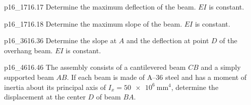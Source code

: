 \documentclass[a4paper]{article}
\newcounter{problem}
\numberwithin{equation}{problem}
\begin{document}


\begin{problemwithimage}{p16_17}{16.17}
  Determine the maximum deflection of the beam.
  $EI$ is constant.
\end{problemwithimage}

\begin{problemwithimage}{p16_17}{16.18}
  Determine the maximum slope of the beam.
  $EI$ is constant.
\end{problemwithimage}

\begin{problemwithimage}{p16_36}{16.36}
  Determine the slope at $A$ and the deflection at point $D$ of the overhang beam.
  $EI$ is constant.
\end{problemwithimage}

\begin{problemwithimage}{p16_46}{16.46}
  The assembly consists of a cantilevered beam $CB$ and a simply supported beam $AB$.
  If each beam is made of A--36 steel and has a moment of inertia about its principal axis of $I_x = \qty{50e6}{\mm^{4}}$, determine the displacement at the center $D$ of beam $BA$.
\end{problemwithimage}
\end{document}
